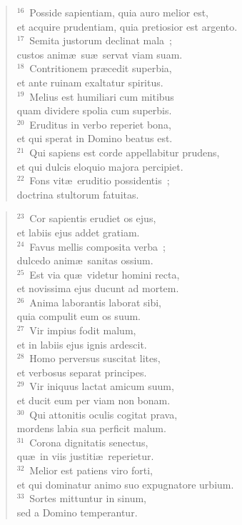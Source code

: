 \begin{flushleft}\begin{verse}${}^{16}$~Posside sapientiam, quia auro melior est,\\ et acquire prudentiam, quia pretiosior est argento.\\
${}^{17}$~Semita justorum declinat mala~;\\ custos anim\ae\ su\ae\ servat viam suam.\\
${}^{18}$~Contritionem pr\ae cedit superbia,\\ et ante ruinam exaltatur spiritus.\\
${}^{19}$~Melius est humiliari cum mitibus\\ quam dividere spolia cum superbis.\\
${}^{20}$~Eruditus in verbo reperiet bona,\\ et qui sperat in Domino beatus est.\\
${}^{21}$~Qui sapiens est corde appellabitur prudens,\\ et qui dulcis eloquio majora percipiet.\\
${}^{22}$~Fons vit\ae\ eruditio possidentis~;\\ doctrina stultorum fatuitas.\end{verse}\end{flushleft}


\begin{flushleft}\begin{verse}${}^{23}$~Cor sapientis erudiet os ejus,\\ et labiis ejus addet gratiam.\\
${}^{24}$~Favus mellis composita verba~;\\ dulcedo anim\ae\ sanitas ossium.\\
${}^{25}$~Est via qu\ae\ videtur homini recta,\\ et novissima ejus ducunt ad mortem.\\
${}^{26}$~Anima laborantis laborat sibi,\\ quia compulit eum os suum.\\
${}^{27}$~Vir impius fodit malum,\\ et in labiis ejus ignis ardescit.\\
${}^{28}$~Homo perversus suscitat lites,\\ et verbosus separat principes.\\
${}^{29}$~Vir iniquus lactat amicum suum,\\ et ducit eum per viam non bonam.\\
${}^{30}$~Qui attonitis oculis cogitat prava,\\ mordens labia sua perficit malum.\\
${}^{31}$~Corona dignitatis senectus,\\ qu\ae\ in viis justiti\ae\ reperietur.\\
${}^{32}$~Melior est patiens viro forti,\\ et qui dominatur animo suo expugnatore urbium.\\
${}^{33}$~Sortes mittuntur in sinum,\\ sed a Domino temperantur.\end{verse}\end{flushleft}


